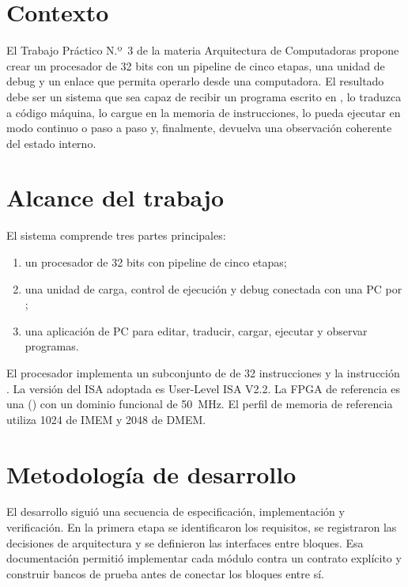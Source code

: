 \section{Contexto}

El Trabajo Práctico N.º~3 de la materia Arquitectura de Computadoras
propone crear un procesador  de 32 bits con un pipeline
de cinco etapas, una unidad de debug y un enlace  que
permita operarlo desde una computadora. El resultado debe ser un
sistema que sea capaz de recibir un programa escrito en
, lo traduzca a código máquina, lo cargue en la
memoria de instrucciones, lo pueda ejecutar en modo continuo o paso a
paso y, finalmente, devuelva una observación coherente del estado interno.

\section{Alcance del trabajo}

El sistema comprende tres partes principales:

\begin{enumerate}
  \item un procesador  de 32 bits con pipeline de cinco etapas;
  \item una unidad de carga, control de ejecución y debug conectada
    con una PC por ;
  \item una aplicación de PC para editar, traducir, cargar, ejecutar y observar
    programas.
\end{enumerate}

El procesador implementa un subconjunto de  de 32
instrucciones y la instrucción . La versión del ISA
adoptada es User-Level ISA V2.2. La FPGA de referencia es una
 () con un dominio funcional de
\SI{50}{\mega\hertz}. El perfil de memoria de referencia utiliza
\SI{1024}{\byte} de IMEM y \SI{2048}{\byte} de DMEM.

\section{Metodología de desarrollo}

El desarrollo siguió una secuencia de especificación, implementación
y verificación. En la primera etapa se identificaron los requisitos,
se registraron las decisiones de arquitectura y se definieron las
interfaces entre bloques. Esa documentación permitió implementar cada
módulo contra un contrato explícito y construir bancos de prueba
antes de conectar los bloques entre sí.

